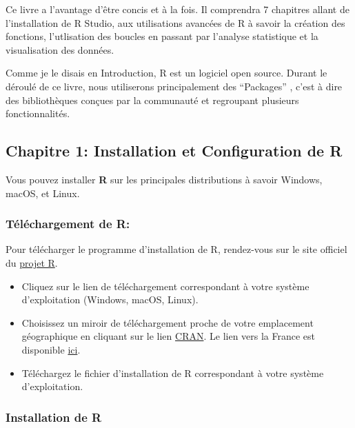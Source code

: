 \documentclass[
]{article}
\providecommand{\tightlist}{%
  \setlength{\itemsep}{0pt}\setlength{\parskip}{0pt}}
\begin{document}
Ce livre a l'avantage d'être concis et à la fois. Il comprendra 7
chapitres allant de l'installation de R Studio, aux utilisations
avancées de R à savoir la création des fonctions, l'utlisation des
boucles en passant par l'analyse statistique et la visualisation des
données.

Comme je le disais en Introduction, R est un logiciel open source.
Durant le déroulé de ce livre, nous utiliserons principalement des
``Packages'' , c'est à dire des bibliothèques conçues par la communauté
et regroupant plusieurs fonctionnalités.

\hypertarget{chapitre-1-installation-et-configuration-de-r}{%
\subsection{Chapitre 1: Installation et Configuration de
R}\label{chapitre-1-installation-et-configuration-de-r}}

Vous pouvez installer \textbf{R} sur les principales distributions à
savoir Windows, macOS, et Linux.

\hypertarget{tuxe9luxe9chargement-de-r}{%
\subsubsection{Téléchargement de R:}\label{tuxe9luxe9chargement-de-r}}

Pour télécharger le programme d'installation de R, rendez-vous sur le
site officiel du \href{https://www.r-project.org/}{projet R}.

\begin{itemize}
\tightlist
\item
  Cliquez sur le lien de téléchargement correspondant à votre système
  d'exploitation (Windows, macOS, Linux).\\
\item
  Choisissez un miroir de téléchargement proche de votre emplacement
  géographique en cliquant sur le lien
  \href{https://cran.r-project.org/mirrors.html}{CRAN}. Le lien vers la
  France est disponible \href{https://pbil.univ-lyon1.fr/CRAN/}{ici}.\\
\item
  Téléchargez le fichier d'installation de R correspondant à votre
  système d'exploitation.
\end{itemize}

\hypertarget{installation-de-r}{%
\subsubsection{Installation de R}\label{installation-de-r}}
\end{document}
